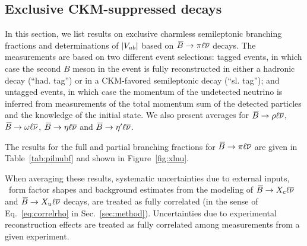 \subsection{Exclusive CKM-suppressed decays}
\label{slbdecays_b2uexcl}
In this section, we list results on exclusive charmless semileptonic branching fractions
and determinations of $|V_{ub}|$ based on $\kern 0.18em\overline{\kern -0.18em B}{}\to\pi\ell\overline{\nu}$ decays.
The measurements are based on two different event selections: tagged
events, in which case the second $B$ meson in the event is fully
reconstructed in either a hadronic decay (``had. tag'') or in a 
CKM-favored semileptonic decay (``sl. tag''); and untagged events, in which case the momentum
of the undetected neutrino is inferred from measurements of the total 
momentum sum of the detected particles and the knowledge of the initial state.
We also present averages for $\kern 0.18em\overline{\kern -0.18em B}{}\to\rho\ell\overline{\nu}$, $\kern 0.18em\overline{\kern -0.18em B}{}\to\omega\ell\overline{\nu}$, $\kern 0.18em\overline{\kern -0.18em B}{}\to\eta\ell\overline{\nu}$ and
$\kern 0.18em\overline{\kern -0.18em B}{}\to\eta'\ell\overline{\nu}$.

The results for the full and partial branching fractions for $\kern 0.18em\overline{\kern -0.18em B}{}\to\pi\ell\overline{\nu}$ are given
in Table~\ref{tab:pilnubf} and shown in Figure~\ref{fig:xlnu}.   

When averaging these results, systematic uncertainties due to external
inputs, \eg\ form factor shapes and background estimates from the
modeling of $\kern 0.18em\overline{\kern -0.18em B}{}\to X_c\ell\overline{\nu}$ and $\kern 0.18em\overline{\kern -0.18em B}{}\to X_u\ell\overline{\nu}$ decays, are
treated as fully correlated (in the sense of Eq.~\ref{eq:correlrho} in
Sec.~\ref{sec:method}).
Uncertainties due to experimental reconstruction effects are treated
as fully correlated among measurements from a given experiment.



